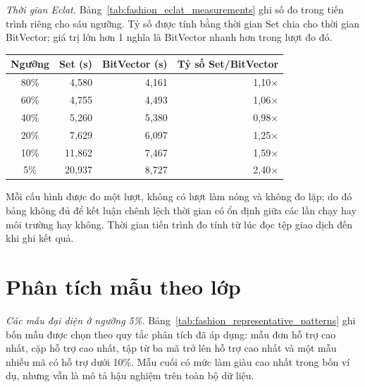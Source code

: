 \textit{Thời gian Eclat.}
Bảng~\ref{tab:fashion_eclat_measurements} ghi số đo trong tiến trình riêng cho sáu ngưỡng. Tỷ số được tính bằng thời gian Set chia cho thời gian BitVector; giá trị lớn hơn 1 nghĩa là BitVector nhanh hơn trong lượt đo đó.

\begin{center}
    \label{tab:fashion_eclat_measurements}
    \scriptsize
    \setlength{\tabcolsep}{4pt}
    \begin{tabular}{@{}c r r r@{}}
        \toprule
        Ngưỡng & Set (s) & BitVector (s) & Tỷ số Set/BitVector \\
        \midrule
        80\% & 4,580 & 4,161 & 1,10$\times$ \\
        60\% & 4,755 & 4,493 & 1,06$\times$ \\
        40\% & 5,260 & 5,380 & 0,98$\times$ \\
        20\% & 7,629 & 6,097 & 1,25$\times$ \\
        10\% & 11,862 & 7,467 & 1,59$\times$ \\
         5\% & 20,937 & 8,727 & 2,40$\times$ \\
        \bottomrule
    \end{tabular}
\end{center}

Mỗi cấu hình được đo một lượt, không có lượt làm nóng và không đo lặp; do đó bảng không đủ để kết luận chênh lệch thời gian có ổn định giữa các lần chạy hay môi trường hay không. Thời gian tiến trình đo tính từ lúc đọc tệp giao dịch đến khi ghi kết quả.

\newpage
\section{Phân tích mẫu theo lớp}
\label{app:fashion_enrichment}

\textit{Các mẫu đại diện ở ngưỡng 5\%.}
Bảng~\ref{tab:fashion_representative_patterns} ghi bốn mẫu được chọn theo quy tắc phân tích đã áp dụng: mẫu đơn hỗ trợ cao nhất, cặp hỗ trợ cao nhất, tập từ ba mã trở lên hỗ trợ cao nhất và một mẫu nhiều mã có hỗ trợ dưới 10\%. Mẫu cuối có mức làm giàu cao nhất trong bốn ví dụ, nhưng vẫn là mô tả hậu nghiệm trên toàn bộ dữ liệu.

